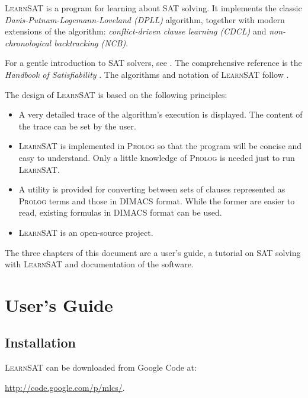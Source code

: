 \documentclass[11pt]{report}
\newcommand*{\ls}{\textsc{LearnSAT}}
\newcommand*{\pl}{\textsc{Prolog}}
\begin{document}
\ls{} is a program for learning about SAT solving. It implements the
classic \emph{Davis-Putnam-Logemann-Loveland (DPLL)} algorithm, together
with modern extensions of the algorithm: \emph{conflict-driven clause
learning (CDCL)} and \emph{non-chronological backtracking (NCB)}.

For a gentle introduction to SAT solvers, see \cite[Chapter~6]{mlcs}.
The comprehensive reference is the \emph{Handbook of Satisfiability}
\cite{SAT}. The algorithms and notation of \ls{} follow \cite{mlm}.

The design of \ls{} is based on the following principles:

\begin{itemize}

\item A very detailed trace of the algorithm's execution is
displayed. The content of the trace can be set by the user.

\item \ls{} is implemented in \pl{} so that the program will be concise
and easy to understand. Only a little knowledge of \pl{} is needed
just to run \ls{}.

\item A utility is provided for converting between sets of clauses
represented as \pl{} terms and those in DIMACS format. While the former
are easier to read, existing formulas in DIMACS format can be used.

\item \ls{} is an open-source project.
\end{itemize}

The three chapters of this document are a user's guide, a tutorial on
SAT solving with \ls{} and documentation of the software.


\chapter{User's Guide}

\section{Installation}

\ls{} can be downloaded from Google Code at:
\begin{center}
\url{http://code.google.com/p/mlcs/}.
\end{center}
\end{document}
